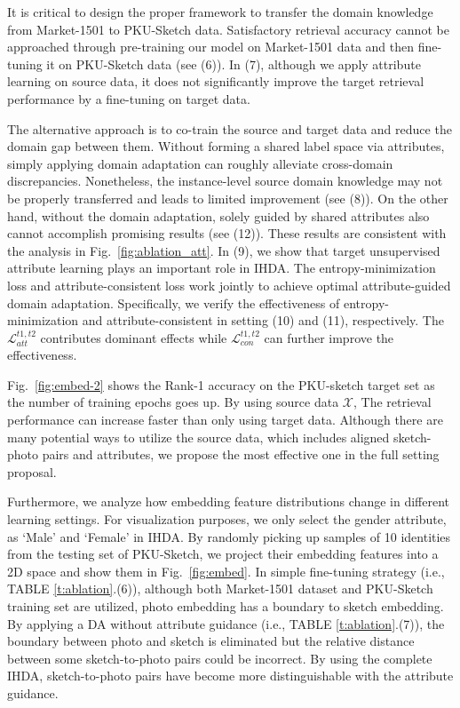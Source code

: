\documentclass[journal]{IEEEtran}
\begin{document}
It is critical to design the proper framework to transfer the domain knowledge from Market-1501 to PKU-Sketch data. Satisfactory retrieval accuracy cannot be approached through pre-training our model on Market-1501 data and then fine-tuning it on PKU-Sketch data (see (6)). In (7), although we apply attribute learning on source data, it does not significantly improve the target retrieval performance by a fine-tuning on target data. 

The alternative approach is to co-train the source and target data and reduce the domain gap between them. Without forming a shared label space via attributes, simply applying domain adaptation can roughly alleviate cross-domain discrepancies. Nonetheless, the instance-level source domain knowledge may not be properly transferred and leads to limited improvement (see (8)). On the other hand, without the domain adaptation, solely guided by shared attributes also cannot accomplish promising results (see (12)). These results are consistent with the analysis in Fig.~\ref{fig:ablation_att}. In (9), we show that target unsupervised attribute learning plays an important role in IHDA. The entropy-minimization loss and attribute-consistent loss work jointly to achieve optimal attribute-guided domain adaptation. Specifically, we verify the effectiveness of entropy-minimization and attribute-consistent in setting (10) and (11), respectively. The $\mathcal{L}^{t1,t2}_{att}$ contributes dominant effects while $\mathcal{L}^{t1,t2}_{con}$ can further improve the effectiveness.
 
Fig.~\ref{fig:embed-2} shows the Rank-1 accuracy on the PKU-sketch target set as the number of training epochs goes up. By using source data $\mathcal{X}$, The retrieval performance can increase faster than only using target data. Although there are many potential ways to utilize the source data, which includes aligned sketch-photo pairs and attributes, we propose the most effective one in the full setting proposal.

Furthermore, we analyze how embedding feature distributions change in different learning settings. For visualization purposes, we only select the gender attribute, as `Male' and `Female' in IHDA. By randomly picking up samples of 10 identities from the testing set of PKU-Sketch, we project their embedding features into a 2D space and show them in Fig.~\ref{fig:embed}. In simple fine-tuning strategy (i.e., TABLE \ref{t:ablation}.(6)), although both Market-1501 dataset and PKU-Sketch training set are utilized, photo embedding has a boundary to sketch embedding. By applying a DA without attribute guidance (i.e., TABLE \ref{t:ablation}.(7)), the boundary between photo and sketch is eliminated but the relative distance between some sketch-to-photo pairs could be incorrect. By using the complete IHDA, sketch-to-photo pairs have become more distinguishable with the attribute guidance.
\end{document}
